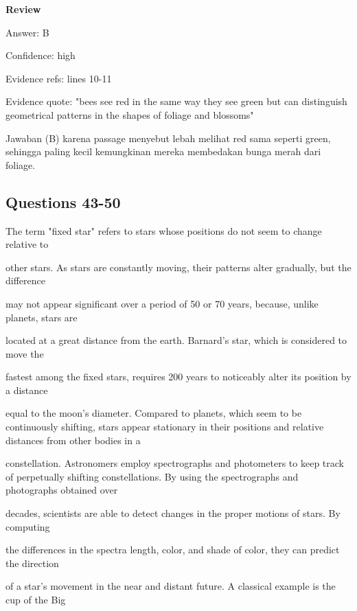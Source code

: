 \documentclass[12pt]{article}
\begin{document}
\par
\begingroup
\setlength{\parskip}{0pt}
\setlength{\parindent}{0pt}
\textbf{Review}\par
Answer: B\par
Confidence: high\par
Evidence refs: lines 10-11\par
Evidence quote: "bees see red in the same way they see green but can distinguish geometrical patterns in the shapes of foliage and blossoms"\par
Jawaban (B) karena passage menyebut lebah melihat red sama seperti green, sehingga paling kecil kemungkinan mereka membedakan bunga merah dari foliage.\par
\endgroup
\par
\vspace{0.25\baselineskip}
\subsection*{Questions 43-50}
\begingroup
\small
\sloppy
\setlength{\parskip}{0pt}
\setlength{\parindent}{0pt}
The term "fixed star" refers to stars whose positions do not seem to change relative to\par
other stars. As stars are constantly moving, their patterns alter gradually, but the difference\par
may not appear significant over a period of 50 or 70 years, because, unlike planets, stars are\par
located at a great distance from the earth. Barnard's star, which is considered to move the\par
fastest among the fixed stars, requires 200 years to noticeably alter its position by a distance\par
equal to the moon's diameter. Compared to planets, which seem to be continuously shifting, stars appear stationary in their positions and relative distances from other bodies in a\par
constellation. Astronomers employ spectrographs and photometers to keep track of perpetually shifting constellations. By using the spectrographs and photographs obtained over\par
decades, scientists are able to detect changes in the proper motions of stars. By computing\par
the differences in the spectra length, color, and shade of color, they can predict the direction\par
of a star's movement in the near and distant future. A classical example is the cup of the Big\par
\end{document}
